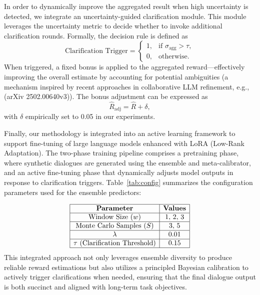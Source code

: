 \documentclass{article}
\begin{document}
In order to dynamically improve the aggregated result when high uncertainty is detected, we integrate an uncertainty-guided clarification module. This module leverages the uncertainty metric to decide whether to invoke additional clarification rounds. Formally, the decision rule is defined as
\[
\text{Clarification Trigger} = 
\begin{cases} 
1, & \text{if } \sigma_{\text{agg}} > \tau, \\
0, & \text{otherwise.}
\end{cases}
\]
When triggered, a fixed bonus is applied to the aggregated reward—effectively improving the overall estimate by accounting for potential ambiguities (a mechanism inspired by recent approaches in collaborative LLM refinement, e.g., (arXiv 2502.00640v3)). The bonus adjustment can be expressed as
\[
\hat{R}_{\text{adj}} = \hat{R} + \delta,
\]
with \(\delta\) empirically set to 0.05 in our experiments.

Finally, our methodology is integrated into an active learning framework to support fine-tuning of large language models enhanced with LoRA (Low-Rank Adaptation). The two-phase training pipeline comprises a pretraining phase, where synthetic dialogues are generated using the ensemble and meta-calibrator, and an active fine-tuning phase that dynamically adjusts model outputs in response to clarification triggers. Table~\ref{tab:config} summarizes the configuration parameters used for the ensemble predictors:

\[
\begin{array}{|c|c|}
\hline
\textbf{Parameter} & \textbf{Values} \\
\hline
\text{Window Size } (w) & 1,\, 2,\, 3 \\
\hline
\text{Monte Carlo Samples } (S) & 3,\, 5 \\
\hline
\lambda & 0.01 \\
\hline
\tau\ (\text{Clarification Threshold}) & 0.15 \\
\hline
\end{array}
\]
This integrated approach not only leverages ensemble diversity to produce reliable reward estimations but also utilizes a principled Bayesian calibration to actively trigger clarifications when needed, ensuring that the final dialogue output is both succinct and aligned with long-term task objectives.
\end{document}
